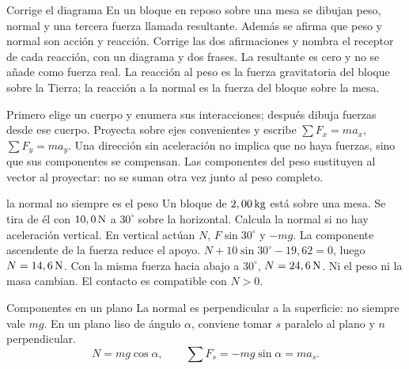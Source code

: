 \documentclass[11pt,a4paper]{article}
\begin{document}
\begin{exercisebox}{Corrige el diagrama}
En un bloque en reposo sobre una mesa se dibujan peso, normal y una tercera fuerza llamada resultante. Adem\'as se afirma que peso y normal son acci\'on y reacci\'on. Corrige las dos afirmaciones y nombra el receptor de cada reacci\'on, con un diagrama y dos frases.
\solutionblock La resultante es cero y no se a\~nade como fuerza real. La reacci\'on al peso es la fuerza gravitatoria del bloque sobre la Tierra; la reacci\'on a la normal es la fuerza del bloque sobre la mesa.
\end{exercisebox}



Primero elige un cuerpo y enumera sus interacciones; despu\'es dibuja fuerzas
desde ese cuerpo. Proyecta sobre ejes convenientes y escribe
$\sum F_x=ma_x$, $\sum F_y=ma_y$. Una direcci\'on sin aceleraci\'on no implica que
no haya fuerzas, sino que sus componentes se compensan.
Las componentes del peso sustituyen al vector al proyectar: no se suman otra vez
junto al peso completo.

\begin{examplebox}{la normal no siempre es el peso}
 Un bloque de $2,00\,\mathrm{kg}$ est\'a sobre una mesa.
Se tira de \'el con $10,0\,\mathrm{N}$ a $30^\circ$ sobre la horizontal.
Calcula la normal si no hay aceleraci\'on vertical.
\solutionblock
{} En vertical act\'uan $N$, $F\sin30^\circ$ y $-mg$.
La componente ascendente de la fuerza reduce el apoyo.
 $N+10\sin30^\circ-19,62=0$, luego $N=14,6\,\mathrm{N}$.
 Con la misma fuerza hacia abajo a $30^\circ$, $N=24,6\,\mathrm{N}$.
Ni el peso ni la masa cambian. El contacto es compatible con $N>0$.
\end{examplebox}

\begin{lessoncard}{Componentes en un plano}
La normal es perpendicular a la superficie: no siempre vale $mg$. En un plano liso de \'angulo $\alpha$, conviene tomar $s$ paralelo al plano y $n$ perpendicular.
\[
N=mg\cos\alpha,\qquad \sum F_s=-mg\sin\alpha=ma_s.
\]
\begin{center}
\end{center}
\end{lessoncard}
\end{document}
